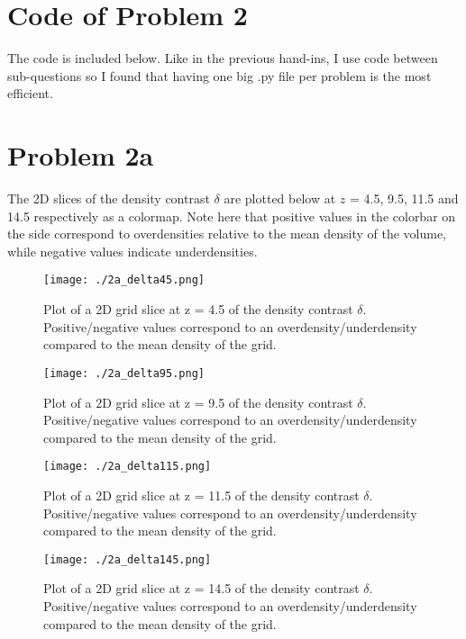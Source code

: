 \section*{Code of Problem 2}

The code is included below. Like in the previous hand-ins, I use code between sub-questions so I found that having one big .py file per problem is the most efficient.


\newpage

\section*{Problem 2a}

The 2D slices of the density contrast $\delta$ are plotted below at $z$ = 4.5, 9.5, 11.5 and 14.5 respectively as a colormap. Note here that positive values in the colorbar on the side correspond to overdensities relative to the mean density of the volume, while negative values indicate underdensities.

\begin{figure}[h!]
  \centering
  \texttt{[image: ./2a\_delta45.png]}
  \caption{Plot of a 2D grid slice at z = 4.5 of the density contrast $\delta$. Positive/negative values correspond to an overdensity/underdensity compared to the mean density of the grid.}
\end{figure}

\begin{figure}[h!]
  \centering
  \texttt{[image: ./2a\_delta95.png]}
  \caption{Plot of a 2D grid slice at z = 9.5 of the density contrast $\delta$. Positive/negative values correspond to an overdensity/underdensity compared to the mean density of the grid.}
\end{figure}

\begin{figure}[h!]
  \centering
  \texttt{[image: ./2a\_delta115.png]}
  \caption{Plot of a 2D grid slice at z = 11.5 of the density contrast $\delta$. Positive/negative values correspond to an overdensity/underdensity compared to the mean density of the grid.}
\end{figure}

\begin{figure}[h!]
  \centering
  \texttt{[image: ./2a\_delta145.png]}
  \caption{Plot of a 2D grid slice at z = 14.5 of the density contrast $\delta$. Positive/negative values correspond to an overdensity/underdensity compared to the mean density of the grid.}
\end{figure}

